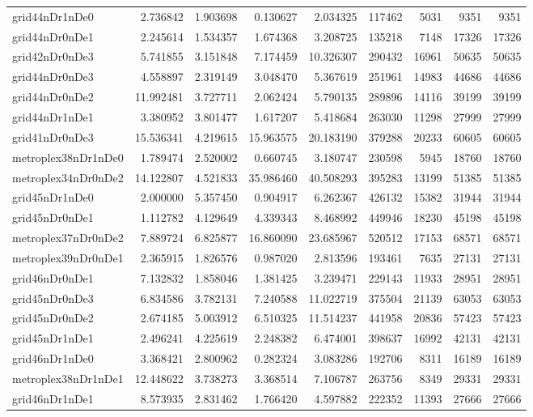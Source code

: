 \begin{longtable}{|l|r|r|r|r|r|r|r|r|}
grid44nDr1nDe0 & 2.736842 & 1.903698 & 0.130627 & 2.034325 & 117462 & 5031 & 9351 & 9351 \\
grid44nDr0nDe1 & 2.245614 & 1.534357 & 1.674368 & 3.208725 & 135218 & 7148 & 17326 & 17326 \\
grid42nDr0nDe3 & 5.741855 & 3.151848 & 7.174459 & 10.326307 & 290432 & 16961 & 50635 & 50635 \\
grid44nDr0nDe3 & 4.558897 & 2.319149 & 3.048470 & 5.367619 & 251961 & 14983 & 44686 & 44686 \\
grid44nDr0nDe2 & 11.992481 & 3.727711 & 2.062424 & 5.790135 & 289896 & 14116 & 39199 & 39199 \\
grid44nDr1nDe1 & 3.380952 & 3.801477 & 1.617207 & 5.418684 & 263030 & 11298 & 27999 & 27999 \\
grid41nDr0nDe3 & 15.536341 & 4.219615 & 15.963575 & 20.183190 & 379288 & 20233 & 60605 & 60605 \\
metroplex38nDr1nDe0 & 1.789474 & 2.520002 & 0.660745 & 3.180747 & 230598 & 5945 & 18760 & 18760 \\
metroplex34nDr0nDe2 & 14.122807 & 4.521833 & 35.986460 & 40.508293 & 395283 & 13199 & 51385 & 51385 \\
grid45nDr1nDe0 & 2.000000 & 5.357450 & 0.904917 & 6.262367 & 426132 & 15382 & 31944 & 31944 \\
grid45nDr0nDe1 & 1.112782 & 4.129649 & 4.339343 & 8.468992 & 449946 & 18230 & 45198 & 45198 \\
metroplex37nDr0nDe2 & 7.889724 & 6.825877 & 16.860090 & 23.685967 & 520512 & 17153 & 68571 & 68571 \\
metroplex39nDr0nDe1 & 2.365915 & 1.826576 & 0.987020 & 2.813596 & 193461 & 7635 & 27131 & 27131 \\
grid46nDr0nDe1 & 7.132832 & 1.858046 & 1.381425 & 3.239471 & 229143 & 11933 & 28951 & 28951 \\
grid45nDr0nDe3 & 6.834586 & 3.782131 & 7.240588 & 11.022719 & 375504 & 21139 & 63053 & 63053 \\
grid45nDr0nDe2 & 2.674185 & 5.003912 & 6.510325 & 11.514237 & 441958 & 20836 & 57423 & 57423 \\
grid45nDr1nDe1 & 2.496241 & 4.225619 & 2.248382 & 6.474001 & 398637 & 16992 & 42131 & 42131 \\
grid46nDr1nDe0 & 3.368421 & 2.800962 & 0.282324 & 3.083286 & 192706 & 8311 & 16189 & 16189 \\
metroplex38nDr1nDe1 & 12.448622 & 3.738273 & 3.368514 & 7.106787 & 263756 & 8349 & 29331 & 29331 \\
grid46nDr1nDe1 & 8.573935 & 2.831462 & 1.766420 & 4.597882 & 222352 & 11393 & 27666 & 27666 \\

\end{longtable}
